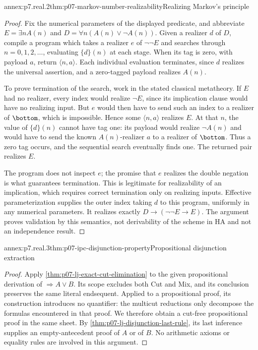 \begin{annexitem}{annex:p7.real.2}{thm:p07-markov-number-realizability}{Realizing Markov's principle}
\begin{proof}
Fix the numerical parameters of the displayed predicate, and abbreviate
\(E=\exists nA(n)\) and
\(D=\forall n(A(n)\lor\neg A(n))\).
Given a realizer \(d\) of \(D\), compile a program which takes a
realizer \(e\) of \(\neg\neg E\) and searches through
\(n=0,1,2,\ldots\), evaluating \(\{d\}(n)\) at each stage.
When its tag is zero, with payload \(a\), return
\(\langle n,a\rangle\). Each individual evaluation terminates,
since \(d\) realizes the universal assertion, and a zero-tagged
payload realizes \(A(n)\).

To prove termination of the search, work in the stated classical
metatheory. If \(E\) had no realizer, every index would realize
\(\neg E\), since its implication clause would have no realizing
input. But \(e\) would then have to send such an index to a realizer
of \(\bottom\), which is impossible. Hence some
\(\langle n,a\rangle\) realizes \(E\). At that \(n\), the
value of \(\{d\}(n)\) cannot have tag one: its payload would
realize \(\neg A(n)\) and would have to send the known
\(A(n)\)-realizer \(a\) to a realizer of \(\bottom\).
Thus a zero tag occurs, and the sequential search eventually finds one.
The returned pair realizes \(E\).

The program does not inspect \(e\); the promise that \(e\) realizes
the double negation is what guarantees termination. This is legitimate
for realizability of an implication, which requires correct termination
only on realizing inputs. Effective parameterization supplies the
outer index taking \(d\) to this program, uniformly in any numerical
parameters. It realizes exactly \(D\to(\neg\neg E\to E)\).
The argument proves validation by this semantics, not derivability of
the scheme in HA and not an independence result.
\end{proof}
\end{annexitem}

\begin{annexitem}{annex:p7.real.3}{thm:p07-ipc-disjunction-property}{Propositional disjunction extraction}
\begin{proof}
Apply \cref{thm:p07-lj-exact-cut-elimination} to the given
propositional derivation of \(\Rightarrow A\lor B\). Its scope
excludes both Cut and Mix, and its conclusion preserves the same
literal endsequent. Applied to a propositional proof, its construction
introduces no quantifier: the multicut reductions only decompose the
formulas encountered in that proof. We therefore obtain a cut-free
propositional proof in the same sheet. By
\cref{thm:p07-lj-disjunction-last-rule}, its last inference supplies
an empty-antecedent proof of \(A\) or of \(B\). No arithmetic
axioms or equality rules are involved in this argument.
\end{proof}
\end{annexitem}

